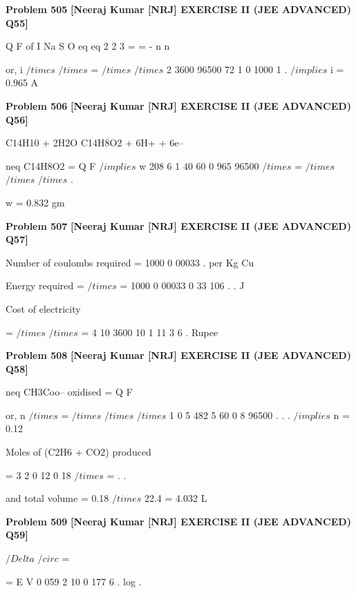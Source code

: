 \begin{problembox}
\textbf{Problem 505} \hfill \textbf{[Neeraj Kumar [NRJ] EXERCISE II (JEE ADVANCED) Q55]}
\label{q:ext-nrj_all_questions-505}

Q
F
of I
Na S O
eq
eq
2
2
3
=
=
-
n
n
 
 or, i $/times$
$/times$
=
$/times$
$/times$
2
3600
96500
72
1 0
1000
1
.
 $/implies$ i = 0.965 A
\end{problembox}

\begin{problembox}
\textbf{Problem 506} \hfill \textbf{[Neeraj Kumar [NRJ] EXERCISE II (JEE ADVANCED) Q56]}
\label{q:ext-nrj_all_questions-506}

C14H10 + 2H2O 
 C14H8O2 + 6H+ + 6e--
 
 neq C14H8O2 = Q
F $/implies$ w
208
6
1
40
60
0 965
96500
$/times$
=
$/times$
$/times$
$/times$ .
 
   w = 0.832 gm
\end{problembox}

\begin{problembox}
\textbf{Problem 507} \hfill \textbf{[Neeraj Kumar [NRJ] EXERCISE II (JEE ADVANCED) Q57]}
\label{q:ext-nrj_all_questions-507}

Number of coulombs required =
1000
0 00033
.
 per Kg Cu
 
 Energy required =
$/times$
=
1000
0 00033
0 33
106
.
.
J
 
   Cost of electricity 
 
  
 
=
$/times$
$/times$
=
4
10
3600
10
1 11
3
6
.
Rupee
\end{problembox}

\begin{problembox}
\textbf{Problem 508} \hfill \textbf{[Neeraj Kumar [NRJ] EXERCISE II (JEE ADVANCED) Q58]}
\label{q:ext-nrj_all_questions-508}

neq CH3Coo-- oxidised = Q
F
 
 or, n $/times$ =
$/times$
$/times$
$/times$
1
0 5
482 5
60
0 8
96500
.
.
. $/implies$ n = 0.12
 
   Moles of (C2H6 + CO2) produced 
 
  
 
 = 3
2
0 12
0 18
$/times$
=
.
.
 
 and total volume = 0.18 $/times$ 22.4 = 4.032 L
\end{problembox}

\begin{problembox}
\textbf{Problem 509} \hfill \textbf{[Neeraj Kumar [NRJ] EXERCISE II (JEE ADVANCED) Q59]}
\label{q:ext-nrj_all_questions-509}

$/Delta$ $/circ$ =
 
=
E
V
0 059
2
10
0 177
6
.
log
.
\end{problembox}

